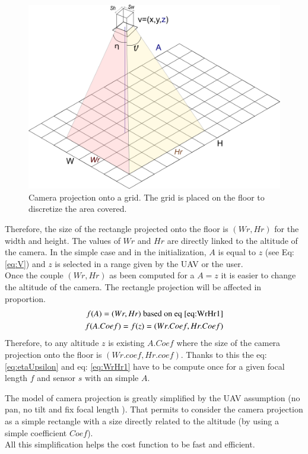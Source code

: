 \begin{figure}[t!]
\centering
{}
  \includegraphics[width=\linewidth]{img/CamProject1Bis.png}
  
  \endminipage\hfill\caption{Camera projection onto a grid. The grid is placed on the floor to discretize the area covered.}\label{fig:cam_proj}
\end{figure}

Therefore, the size of the rectangle projected onto the floor is $(Wr,Hr)$ for the width and height. The values of $Wr$ and $Hr$ are directly linked to the altitude of the camera. In the simple case and in the initialization, $A$ is equal to $z$ (see Eq:\ref{eq:V})  and $z$ is selected in a range given by the UAV or the user. \\
Once the couple $(Wr,Hr)$ as been computed for a $A=z$ it is easier to change the altitude of the camera. The rectangle projection will be affected in proportion.
\begin{equation}\label{eq:A.coef}
	\begin{split}
    	f(A)= (Wr,Hr) \text{ based on eq \ref{eq:WrHr1}}\\
    	f(A.Coef)=f(z)= (Wr.Coef,Hr.Coef)      
     \end{split} 
\end{equation}
Therefore, to any altitude $z$ is existing $A.Coef$ where the size of the camera projection onto the floor is $(Wr.coef, Hr.coef)$. Thanks to this the eq: \ref{eq:etaUpsilon} and eq: \ref{eq:WrHr1} have to be compute once  for a given focal length $f$  and sensor $s$ with an simple $A$.

The model of camera projection is greatly simplified by the UAV assumption (no pan, no tilt and fix focal length ). That permits to consider  the camera projection as a simple rectangle with a size directly related to the altitude (by using a simple coefficient $Coef$).\\
All this simplification helps the cost function to be fast and efficient. \\

